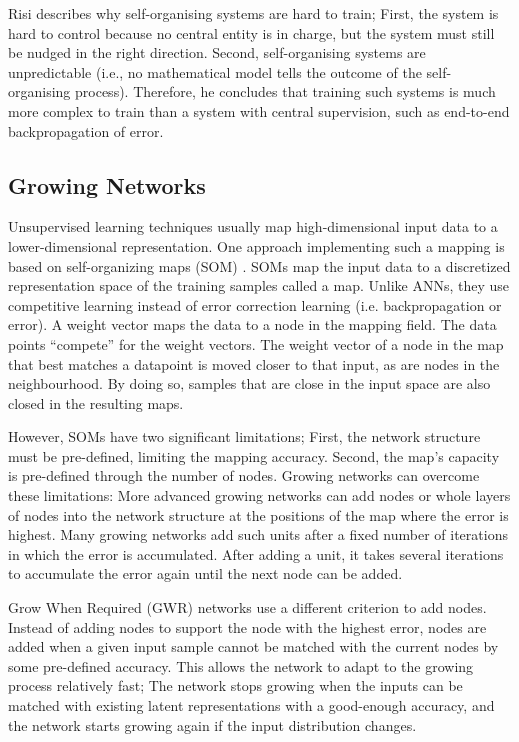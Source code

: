 Risi  describes why self-organising systems are hard to train;
First, the system is hard to control because no central entity is in charge, but the system must still be nudged in the right direction.
Second, self-organising systems are unpredictable (i.e., no mathematical model tells the outcome of the self-organising process). Therefore, he concludes that training such systems is much more complex to train than a system with central supervision, such as end-to-end backpropagation of error.


\subsection{Growing Networks}
Unsupervised learning techniques usually map high-dimensional input data to a lower-dimensional representation.
One approach implementing such a mapping is based on self-organizing maps (SOM) .
SOMs map the input data to a discretized representation space of the training samples called a map.
Unlike ANNs, they use competitive learning instead of error correction learning (i.e. backpropagation or error).
A weight vector maps the data to a node in the mapping field.
The data points ``compete'' for the weight vectors.
The weight vector of a node in the map that best matches a datapoint is moved closer to that input, as are nodes in the neighbourhood.
By doing so, samples that are close in the input space are also closed in the resulting maps.

However, SOMs have two significant limitations; First, the network structure must be pre-defined, limiting the mapping accuracy. Second, the map's capacity is pre-defined through the number of nodes.
Growing networks can overcome these limitations:
More advanced growing networks can add nodes or whole layers of nodes into the network structure at the positions of the map where the error is highest.
Many growing networks  add such units after a fixed number of iterations in which the error is accumulated.
After adding a unit, it takes several iterations to accumulate the error again until the next node can be added.

Grow When Required (GWR) networks  use a different criterion to add nodes.
Instead of adding nodes to support the node with the highest error, nodes are added when a given input sample cannot be matched with the current nodes by some pre-defined accuracy.
This allows the network to adapt to the growing process relatively fast; The network stops growing when the inputs can be matched with existing latent representations with a good-enough accuracy, and the network starts growing again if the input distribution changes.

